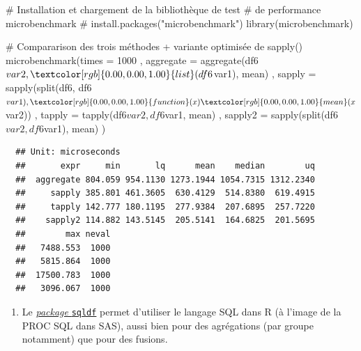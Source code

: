 \documentclass[12pt,twosided, notitlepage]{book}
\newenvironment{Shaded}{}{}
\newcommand{\KeywordTok}[1]{\textcolor[rgb]{0.00,0.00,1.00}{#1}}
\newcommand{\DataTypeTok}[1]{#1}
\newcommand{\DecValTok}[1]{#1}
\newcommand{\CommentTok}[1]{\textcolor[rgb]{0.00,0.50,0.00}{#1}}
\newcommand{\ControlFlowTok}[1]{\textcolor[rgb]{0.00,0.00,1.00}{#1}}
\newcommand{\OperatorTok}[1]{#1}
\newcommand{\NormalTok}[1]{#1}
\providecommand{\tightlist}{%
  \setlength{\itemsep}{0pt}\setlength{\parskip}{0pt}}
\renewenvironment{Shaded}{\begin{snugshade}}{\end{snugshade}}
\begin{document}
\begin{Shaded}
\begin{Highlighting}[]
\CommentTok{# Installation et chargement de la bibliothèque de test }
\CommentTok{# de performance microbenchmark}
\CommentTok{# install.packages("microbenchmark")}
\KeywordTok{library}\NormalTok{(microbenchmark)}

\CommentTok{# Compararison des trois méthodes + variante optimisée de sapply()}
\KeywordTok{microbenchmark}\NormalTok{(}\DataTypeTok{times =} \DecValTok{1000}
\NormalTok{  , }\DataTypeTok{aggregate =} \KeywordTok{aggregate}\NormalTok{(df6}\OperatorTok{$}\NormalTok{var2, }\KeywordTok{list}\NormalTok{(df6}\OperatorTok{$}\NormalTok{var1), mean)}
\NormalTok{  , }\DataTypeTok{sapply =} \KeywordTok{sapply}\NormalTok{(}\KeywordTok{split}\NormalTok{(df6, df6}\OperatorTok{$}\NormalTok{var1), }\ControlFlowTok{function}\NormalTok{(x) }\KeywordTok{mean}\NormalTok{(x}\OperatorTok{$}\NormalTok{var2))}
\NormalTok{  , }\DataTypeTok{tapply =} \KeywordTok{tapply}\NormalTok{(df6}\OperatorTok{$}\NormalTok{var2, df6}\OperatorTok{$}\NormalTok{var1, mean)}
\NormalTok{  , }\DataTypeTok{sapply2 =} \KeywordTok{sapply}\NormalTok{(}\KeywordTok{split}\NormalTok{(df6}\OperatorTok{$}\NormalTok{var2, df6}\OperatorTok{$}\NormalTok{var1), mean)}
\NormalTok{)}
\end{Highlighting}
\end{Shaded}

\begin{verbatim}
  ## Unit: microseconds
  ##       expr     min       lq      mean    median        uq
  ##  aggregate 804.059 954.1130 1273.1944 1054.7315 1312.2340
  ##     sapply 385.801 461.3605  630.4129  514.8380  619.4915
  ##     tapply 142.777 180.1195  277.9384  207.6895  257.7220
  ##    sapply2 114.882 143.5145  205.5141  164.6825  201.5695
  ##        max neval
  ##   7488.553  1000
  ##   5815.864  1000
  ##  17500.783  1000
  ##   3096.067  1000
\end{verbatim}

\begin{enumerate}
\def\labelenumi{\arabic{enumi}.}
\setcounter{enumi}{1}
\tightlist
\item
  Le
  \href{http://www.gettinggeneticsdone.com/2010/05/use-sql-queries-to-manipulate-data.html}{\emph{package}
  \texttt{sqldf}} permet d'utiliser le langage SQL dans R (à l'image de
  la PROC SQL dans SAS), aussi bien pour des agrégations (par groupe
  notamment) que pour des fusions.
\end{enumerate}
\end{document}
